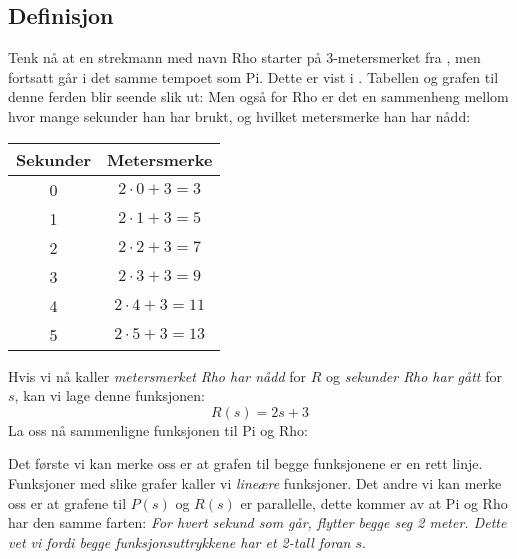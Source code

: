 \subsection{Definisjon}
Tenk nå at en strekmann med navn Rho starter på 3-metersmerket fra , men fortsatt går i det samme tempoet som Pi. Dette er vist i . Tabellen og grafen til denne ferden blir seende slik ut:
\quad
{}
Men også for Rho er det en sammenheng mellom hvor mange sekunder han har brukt, og hvilket metersmerke han har nådd:
\begin{center}
		\begin{tabular}{|c|c|}
		\hline
		\textbf{Sekunder} & \textbf{Metersmerke}\\ \hline 
		0 & $ 2\cdot0+3=3 $\\ \hline 
		1 & $ 2\cdot1+3=5 $\\ \hline 
		2 & $ 2\cdot2+3=7 $ \\\hline 
		3 & $ 2\cdot3+3=9 $ \\\hline 
		4 & $ 2\cdot4+3=11 $ \\\hline 
		5 & $ 2\cdot5+3=13 $\\\hline 
	\end{tabular}
\end{center}
Hvis vi nå kaller \textit{metersmerket Rho har nådd} for $ R $ og \textit{sekunder Rho har gått} for $ s $, kan vi lage denne funksjonen:
\[ R(s)=2s+3 \]
La oss nå sammenligne funksjonen til Pi og Rho:

\parbox[c]{0.75\linewidth}{}\quad
{}

Det første vi kan merke oss er at grafen til begge funksjonene er en rett linje. Funksjoner med slike grafer kaller vi \textit{lineære} funksjoner. Det andre vi kan merke oss er at grafene til $ P(s) $ og $ R(s) $ er parallelle, dette kommer av at Pi og Rho har den samme farten: \textsl{For hvert sekund som går, flytter begge seg 2 meter. Dette vet vi fordi begge funksjonsuttrykkene har et 2-tall foran $ s $}.\vsk 

